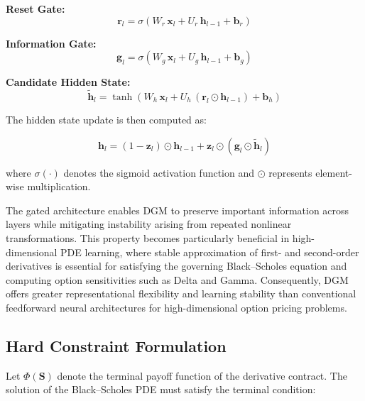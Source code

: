 \documentclass[12pt, a4paper]{article}
\begin{document}
\noindent\textbf{Reset Gate:}
\begin{equation}
    \mathbf{r}_l = \sigma(W_r\,\mathbf{x}_l + U_r\,\mathbf{h}_{l-1} + \mathbf{b}_r)
    \label{eq:reset_gate}
\end{equation}

\noindent\textbf{Information Gate:}
\begin{equation}
    \mathbf{g}_l = \sigma(W_g\,\mathbf{x}_l + U_g\,\mathbf{h}_{l-1} + \mathbf{b}_g)
    \label{eq:info_gate}
\end{equation}

\noindent\textbf{Candidate Hidden State:}
\begin{equation}
    \tilde{\mathbf{h}}_l = \tanh\!\left(
        W_h\,\mathbf{x}_l + U_h\,(\mathbf{r}_l \odot \mathbf{h}_{l-1}) + \mathbf{b}_h
    \right)
    \label{eq:candidate}
\end{equation}

The hidden state update is then computed as:

\begin{equation}
    \mathbf{h}_l = (1 - \mathbf{z}_l) \odot \mathbf{h}_{l-1}
                 + \mathbf{z}_l \odot (\mathbf{g}_l \odot \tilde{\mathbf{h}}_l)
    \label{eq:hidden_update}
\end{equation}

where $\sigma(\cdot)$ denotes the sigmoid activation function and
$\odot$ represents element-wise multiplication.

The gated architecture enables DGM to preserve important information
across layers while mitigating instability arising from repeated
nonlinear transformations. This property becomes particularly beneficial
in high-dimensional PDE learning, where stable approximation of first-
and second-order derivatives is essential for satisfying the governing
Black--Scholes equation and computing option sensitivities such as Delta
and Gamma. Consequently, DGM offers greater representational flexibility
and learning stability than conventional feedforward neural architectures
for high-dimensional option pricing problems.

\subsection{Hard Constraint Formulation}

Let $\Phi(\mathbf{S})$ denote the terminal payoff function of the
derivative contract. The solution of the Black--Scholes PDE must satisfy
the terminal condition:
\end{document}
